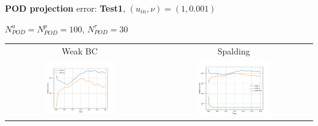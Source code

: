 \documentclass[9pt,compress,t,aspectratio=169]{beamer}
\newcommand{\1}{\begin{pmatrix}
		1\\
		1
\end{pmatrix}}
\newcommand{\highlight}[1]{\textbf{\color{bluemathlab}#1}}
\newcommand{\highlightB}[1]{\textbf{\color{black!15!orangemathlab}#1}}
\begin{document}
\begin{frame}{\highlight{POD projection} error: \highlightB{Test1},  $(u_{in},\nu)=(1,0.001)$}
	
	\begin{center}
		$N_{POD}^u=N_{POD}^p=100$, $N_{POD}^\tau=30$
	\begin{tabular}{cc}
		Weak BC& Spalding\\
		\includegraphics[width=0.49\textwidth]{figures/cylinder_weak_errors_vs_time_proj.pdf}&
		\includegraphics[width=0.49\textwidth]{figures/cylinder_spalding_errors_vs_time_proj.pdf}
	\end{tabular}
	\end{center}
\end{frame}
\end{document}
